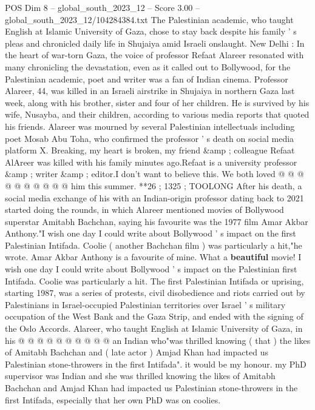 \begin{textsample}{POS Dim 8 – global\_south\_2023\_12 – Score 3.00 – global\_south\_2023\_12/104284384.txt}  \label{ex:f8_pos_433}
The Palestinian academic, who taught English at Islamic University of Gaza, chose to stay back despite his family ' s pleas and chronicled daily life in Shujaiya amid Israeli onslaught.
New Delhi : In the heart of war-torn Gaza, the voice of professor Refaat Alareer resonated with many chronicling the devastation, even as it called out to Bollywood, for the Palestinian academic, poet and writer was a fan of Indian cinema.
Professor Alareer, 44, was killed in an Israeli airstrike in Shujaiya in northern Gaza last week, along with his brother, sister and four of her children.
He is survived by his wife, Nusayba, and their children, according to various media reports that quoted his friends.
Alareer was mourned by several Palestinian intellectuals including poet Mosab Abu Toha, who confirmed the professor ' s death on social media platform X.
Breaking, my heart is broken, my friend \&amp ; colleague Refaat AlAreer was killed with his family minutes ago.Refaat is a university professor \&amp ; writer \&amp ; editor.I don't want to believe this.
We both loved @ @ @ @ @ @ @ @ @ @ him this summer. **26 ; 1325 ; TOOLONG After his death, a social media exchange of his with an Indian-origin professor dating back to 2021 started doing the rounds, in which Alareer mentioned movies of Bollywood superstar Amitabh Bachchan, saying his favourite was the 1977 film Amar Akbar Anthony."I wish one day I could write about Bollywood ' s impact on the first Palestinian Intifada.
Coolie ( another Bachchan film ) was particularly a hit,"he wrote.
Amar Akbar Anthony is a favourite of mine.
What a \textbf{beautiful} movie!
I wish one day I could write about Bollywood ' s impact on the Palestinian first Intifada.
Coolie was particularly a hit.
The first Palestinian Intifada or uprising, starting 1987, was a series of protests, civil disobedience and riots carried out by Palestinians in Israel-occupied Palestinian territories over Israel ' s military occupation of the West Bank and the Gaza Strip, and ended with the signing of the Oslo Accords.
Alareer, who taught English at Islamic University of Gaza, in his @ @ @ @ @ @ @ @ @ @ an Indian who"was thrilled knowing ( that ) the likes of Amitabh Bachchan and ( late actor ) Amjad Khan had impacted us Palestinian stone-throwers in the first Intifada". it would be my honour. my PhD supervisor was Indian and she was thrilled knowing the likes of Amitabh Bachchan and Amjad Khan had impacted us Palestinian stone-throwers in the first Intifada, especially that her own PhD was on coolies.

\end{textsample}
